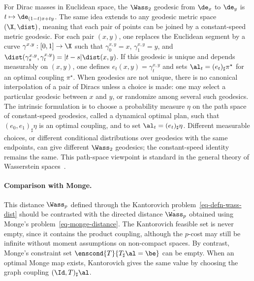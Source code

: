 \begin{rem}
For Dirac masses in Euclidean space, the $\Wass_2$ geodesic from $\de_x$ to $\de_y$ is $t\mapsto\de_{(1-t)x+t y}$. The same idea extends to any geodesic metric space $(\X,\dist)$, meaning that each pair of points can be joined by a constant-speed metric geodesic. For each pair $(x,y)$, one replaces the Euclidean segment by a curve $\gamma^{x,y}:[0,1]\to\X$ such that $\gamma^{x,y}_0=x$, $\gamma^{x,y}_1=y$, and
$\dist(\gamma^{x,y}_s,\gamma^{x,y}_t)=|t-s|\dist(x,y)$.
If this geodesic is unique and depends measurably on $(x,y)$, one defines $e_t(x,y)=\gamma^{x,y}_t$ and sets $\al_t=(e_t)_\sharp\pi^\star$ for an optimal coupling $\pi^\star$. When geodesics are not unique, there is no canonical interpolation of a pair of Diracs unless a choice is made: one may select a particular geodesic between $x$ and $y$, or randomize among several such geodesics. The intrinsic formulation is to choose a probability measure $\eta$ on the path space of constant-speed geodesics, called a dynamical optimal plan, such that $(e_0,e_1)_\sharp\eta$ is an optimal coupling, and to set $\al_t=(e_t)_\sharp\eta$. Different measurable choices, or different conditional distributions over geodesics with the same endpoints, can give different $\Wass_2$ geodesics; the constant-speed identity remains the same. This path-space viewpoint is standard in the general theory of Wasserstein spaces~\cite{ambrosio2006gradient,Villani09,SantambrogioBook}.
\end{rem}

\paragraph{Comparison with Monge.}

	This distance $\Wass_p$ defined through the Kantorovich problem~\eqref{eq-defn-wass-dist} should be contrasted with the directed distance $\tilde\Wass_p$ obtained using Monge's problem~\eqref{eq-monge-distance}. The Kantorovich feasible set is never empty, since it contains the product coupling, although the $p$-cost may still be infinite without moment assumptions on non-compact spaces. By contrast, Monge's constraint set $\enscond{T}{T_\sharp \al=\be}$ can be empty. When an optimal Monge map exists, Kantorovich gives the same value by choosing the graph coupling $(\Id,T)_\sharp\al$.

